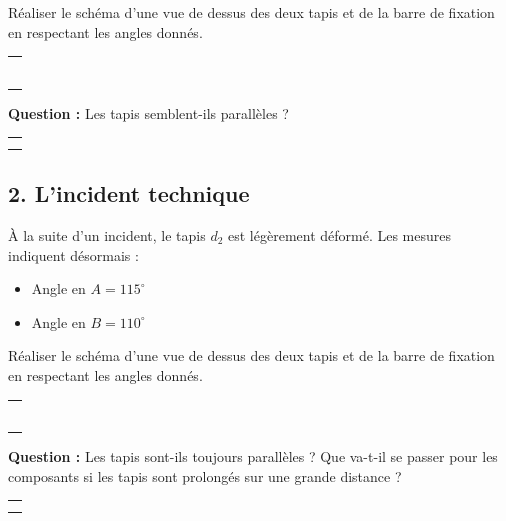 \documentclass[a4paper]{book}
\begin{document}
\begin{exercice}
        Réaliser le schéma d'une vue de dessus des deux tapis et de la barre de fixation en respectant les angles donnés.

        \begin{tabular}{|p{16cm}|}
            \hline \\ \\ \\ \\ \\ \\ \hline            
        \end{tabular}
   
        \textbf{Question :} Les tapis semblent-ils parallèles ?
        
       \begin{tabular}{|p{16cm}|}
            \hline \\ \\ \hline            
        \end{tabular}
        
        \subsection*{2. L'incident technique}
        À la suite d'un incident, le tapis $d_2$ est légèrement déformé. Les mesures indiquent désormais :
        \begin{itemize}
            \item Angle en $A = 115^\circ$
            \item Angle en $B = 110^\circ$
        \end{itemize}

        Réaliser le schéma d'une vue de dessus des deux tapis et de la barre de fixation en respectant les angles donnés.

        \begin{tabular}{|p{16cm}|}
            \hline \\ \\ \\ \\ \\ \\ \hline            
        \end{tabular}

        \textbf{Question :} Les tapis sont-ils toujours parallèles ? Que va-t-il se passer pour les composants si les tapis sont prolongés sur une grande distance ?

       \begin{tabular}{|p{16cm}|}
            \hline \\ \\ \hline            
        \end{tabular}
        

\end{exercice}
\end{document}
